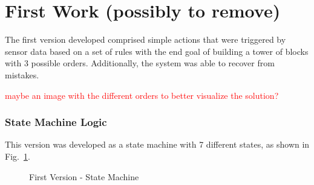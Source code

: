 {\color{gray}
\section{First Work (possibly to remove)}

The first version developed comprised simple actions that were triggered by sensor data based on a set of rules with the end goal of building a tower of blocks with 3 possible orders. Additionally, the system was able to recover from mistakes.

\textcolor{red}{maybe an image with the different orders to better visualize the solution?}

\subsubsection{State Machine Logic}

This version was developed as a state machine with 7 different states, as shown in Fig.~\ref{fig:demo1_state_machine}.

\begin{figure}[H]%
    \centering
    
    \caption{First Version - State Machine}
    \label{fig:demo1_state_machine}
\end{figure}

}
